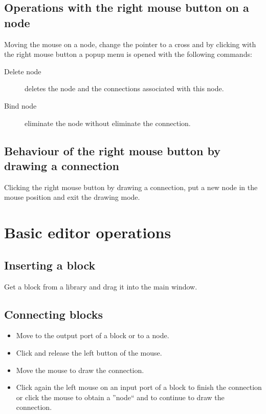 \subsection{Operations with the right mouse button on a node}

Moving the mouse on a node, change the pointer to a cross and by 
clicking with the right mouse button a popup menu is opened with the following 
commands:

\begin{description}
\item[Delete node] deletes the node and the connections associated with this 
node.
\item [Bind node] eliminate the node without eliminate the connection.
\end{description}

\subsection{Behaviour of the right mouse button by drawing a connection}
Clicking the right mouse button by drawing a connection, put a new node in the 
mouse position and exit the drawing mode.

\section{Basic editor operations}

\subsection{Inserting a block}
Get a block from a library and drag it into the main window.

\subsection{Connecting blocks}
\begin{itemize}
\item Move to the output port of a block or to a node.
\item Click and release the left button of the mouse.
\item Move the mouse to draw the connection.
\item Click again the left mouse on an input port of a block to finish the 
connection or click the mouse to obtain a ''node`` and to continue to draw the 
connection.
\end{itemize}

